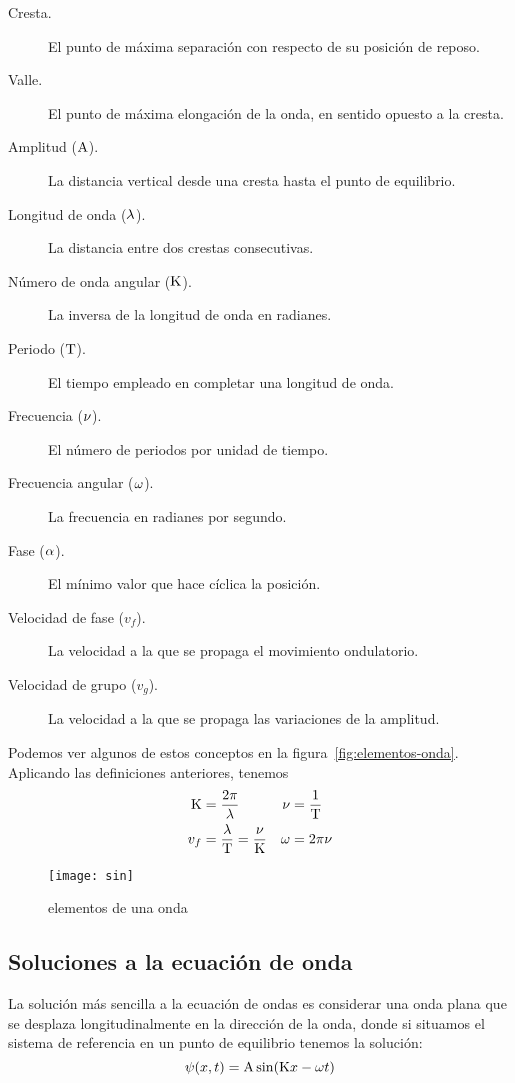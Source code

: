 \begin{description}
    \item[Cresta.] El punto de máxima separación con respecto de su posición de reposo.
    \item[Valle.] El punto de máxima elongación de la onda, en sentido opuesto a la cresta.
    \item[Amplitud ($\mathrm{A}$).] La distancia vertical desde una cresta hasta el punto de equilibrio.
    \item[Longitud de onda ($\lambda$).] La distancia entre dos crestas consecutivas.
    \item[Número de onda angular ($\mathrm{K}$).] La inversa de la longitud de onda en radianes.
    \item[Periodo ($\mathrm{T}$).] El tiempo empleado en completar una longitud de onda.
    \item[Frecuencia ($\nu$).] El número de periodos por unidad de tiempo.
    \item[Frecuencia angular ($\omega$).] La frecuencia en radianes por segundo.
    \item[Fase ($\alpha$).] El mínimo valor que hace cíclica la posición.
    \item[Velocidad de fase ($v_f$).] La velocidad a la que se propaga el movimiento ondulatorio.
    \item[Velocidad de grupo ($v_g$).] La velocidad a la que se propaga las variaciones de la amplitud.
\end{description}
Podemos ver algunos de estos conceptos en la figura~\eqref{fig:elementos-onda}.
Aplicando las definiciones anteriores, tenemos
\begin{align*}
    \mathrm{K} &= \frac{2\pi}{\lambda} & \nu &=\frac{1}{\mathrm{T}} \\
    v_f &= \frac{\lambda}{\mathrm{T}}=\frac{\nu}{\mathrm{K}} & \omega &= 2\pi\nu
\end{align*}

\begin{figure}[htbp]
    \centering
    \texttt{[image: sin]}
    \caption{elementos de una onda}
    \label{fig:elementos-onda}
\end{figure}

\subsection{Soluciones a la ecuación de onda}\label{subsec:soluciones-a-la-ecuación-de-onda}
La solución más sencilla a la ecuación de ondas es considerar una onda plana que se desplaza longitudinalmente en la dirección de la onda, donde si situamos el sistema de referencia en un punto de equilibrio tenemos la solución:
\begin{equation}
    \label{eq:solucion-ecuacion-ondas-simple}
    \psi(x,t)=\mathrm{A}\sin(\mathrm{K} x - \omega t)
\end{equation}

